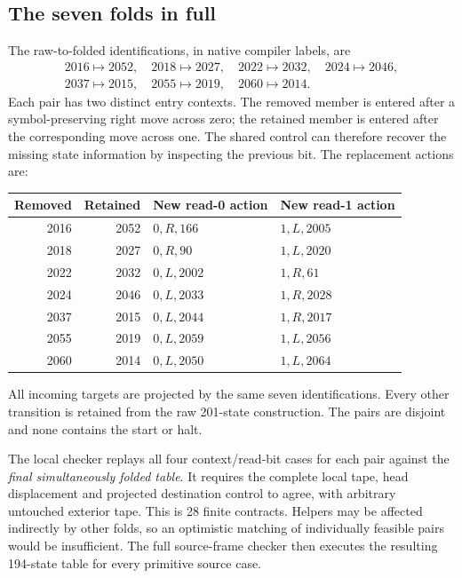 \documentclass[11pt,letterpaper]{article}
\begin{document}
\subsection{The seven folds in full}

The raw-to-folded identifications, in native compiler labels, are
\[
\begin{gathered}
 2016\mapsto2052,\quad 2018\mapsto2027,\quad
 2022\mapsto2032,\quad 2024\mapsto2046,\\
 2037\mapsto2015,\quad2055\mapsto2019,\quad2060\mapsto2014.
\end{gathered}
\]
Each pair has two distinct entry contexts. The removed member is entered
after a symbol-preserving right move across zero; the retained member is
entered after the corresponding move across one. The shared control can
therefore recover the missing state information by inspecting the previous
bit. The replacement actions are:

\begin{center}\small
\begin{tabular}{@{}rrll@{}}
\toprule
Removed & Retained & New read-0 action & New read-1 action\\
\midrule
2016&2052&$0,R,166$&$1,L,2005$\\
2018&2027&$0,R,90$&$1,L,2020$\\
2022&2032&$0,L,2002$&$1,R,61$\\
2024&2046&$0,L,2033$&$1,R,2028$\\
2037&2015&$0,L,2044$&$1,R,2017$\\
2055&2019&$0,L,2059$&$1,L,2056$\\
2060&2014&$0,L,2050$&$1,L,2064$\\
\bottomrule
\end{tabular}
\end{center}
All incoming targets are projected by the same seven identifications.
Every other transition is retained from the raw 201-state construction.
The pairs are disjoint and none contains the start or halt.

The local checker replays all four context/read-bit cases for each pair
against the \emph{final simultaneously folded table}. It requires the
complete local tape, head displacement and projected destination control
to agree, with arbitrary untouched exterior tape. This is 28 finite
contracts. Helpers may be affected indirectly by other folds, so an
optimistic matching of individually feasible pairs would be insufficient.
The full source-frame checker then executes the resulting 194-state table
for every primitive source case.
\end{document}

